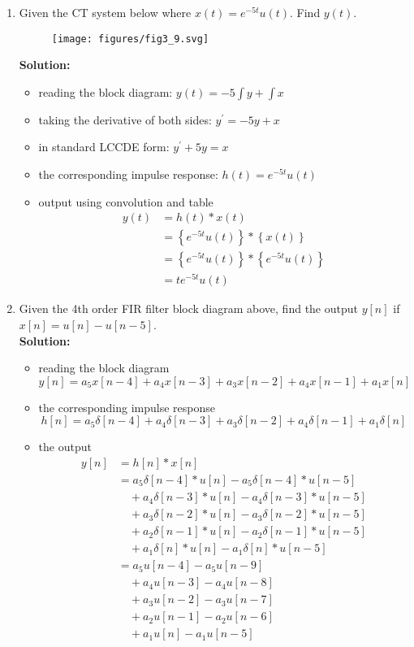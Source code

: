 \documentclass{article}
\begin{document}
\begin{enumerate}
\item
  Given the CT system below where $x(t) = e^{-5t}u(t)$. Find $y(t)$.

  \begin{figure}
  \centering
  \texttt{[image: figures/fig3\_9.svg]}
  \end{figure}

  \textbf{Solution:}
  \begin{itemize}
  \item reading the block diagram: $y(t) = -5\int y + \int x$
  \item taking the derivative of both sides: $y^\prime = -5y + x$
  \item in standard LCCDE form: $y^\prime + 5y = x$
  \item the corresponding impulse response: $h(t) = e^{-5t}u(t)$
  \item output using convolution and table
    \begin{align}
      y(t) &= h(t) * x(t)\\
      &=\left\{ e^{-5t}u(t) \right\}*\left\{ x(t) \right\}\\
      &=\left\{ e^{-5t}u(t) \right\}*\left\{ e^{-5t}u(t) \right\}\\
      &= te^{-5t}u(t)
    \end{align}
  \end{itemize}

\item
  Given the 4th order FIR filter block diagram above, find the output $y[n]$ if $x[n] = u[n] - u[n-5]$.\\
  \textbf{Solution:}
  \begin{itemize}
  \item reading the block diagram
    \[
    y[n] = a_5 x[n-4] + a_4 x[n-3] + a_3 x[n-2] + a_4 x[n-1] + a_1 x[n]
    \]
  \item the corresponding impulse response
    \[
    h[n] = a_5 \delta[n-4] + a_4 \delta[n-3] + a_3 \delta[n-2] + a_4 \delta[n-1] + a_1 \delta[n]
    \]
  \item the output
    \begin{align}
      y[n] &= h[n]*x[n]\\
      &= a_5\delta[n-4]*u[n] - a_5\delta[n-4]*u[n-5]\\
      &\quad + a_4\delta[n-3]*u[n] - a_4\delta[n-3]*u[n-5]\\
      &\quad + a_3\delta[n-2]*u[n] - a_3\delta[n-2]*u[n-5]\\
      &\quad + a_2\delta[n-1]*u[n] - a_2\delta[n-1]*u[n-5]\\
      &\quad + a_1\delta[n]*u[n] - a_1\delta[n]*u[n-5]\\
      &= a_5u[n-4] - a_5u[n-9]\\
      &\quad + a_4u[n-3] - a_4u[n-8]\\
      &\quad + a_3u[n-2] - a_3u[n-7]\\
      &\quad + a_2u[n-1] - a_2u[n-6]\\
      &\quad + a_1u[n] - a_1u[n-5]\\
    \end{align}

  \end{itemize}
  
\end{enumerate}
\end{document}
